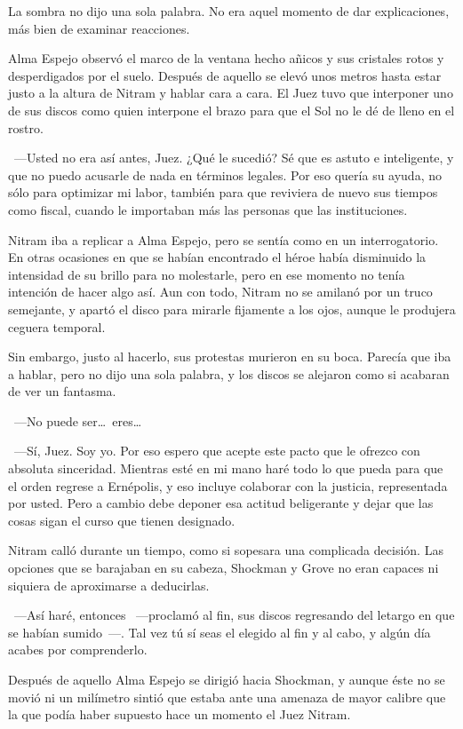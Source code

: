 La sombra no dijo una sola palabra. No era aquel momento de dar explicaciones, más bien de examinar reacciones.

Alma Espejo observó el marco de la ventana hecho añicos y sus cristales rotos y desperdigados por el suelo. Después de aquello se elevó unos metros hasta estar justo a la altura de Nitram y hablar cara a cara. El Juez tuvo que interponer uno de sus discos como quien interpone el brazo para que el Sol no le dé de lleno en el rostro.

~---Usted no era así antes, Juez. ¿Qué le sucedió? Sé que es astuto e inteligente, y que no puedo acusarle de nada en términos legales. Por eso quería su ayuda, no sólo para optimizar mi labor, también para que reviviera de nuevo sus tiempos como fiscal, cuando le importaban más las personas que las instituciones.

Nitram iba a replicar a Alma Espejo, pero se sentía como en un interrogatorio. En otras ocasiones en que se habían encontrado el héroe había disminuido la intensidad de su brillo para no molestarle, pero en ese momento no tenía intención de hacer algo así. Aun con todo, Nitram no se amilanó por un truco semejante, y apartó el disco para mirarle fijamente a los ojos, aunque le produjera ceguera temporal.

Sin embargo, justo al hacerlo, sus protestas murieron en su boca. Parecía que iba a hablar, pero no dijo una sola palabra, y los discos se alejaron como si acabaran de ver un fantasma.

~---No puede ser\dots\ eres\dots

~---Sí, Juez. Soy yo. Por eso espero que acepte este pacto que le ofrezco con absoluta sinceridad. Mientras esté en mi mano haré todo lo que pueda para que el orden regrese a Ernépolis, y eso incluye colaborar con la justicia, representada por usted. Pero a cambio debe deponer esa actitud beligerante y dejar que las cosas sigan el curso que tienen designado.

Nitram calló durante un tiempo, como si sopesara una complicada decisión. Las opciones que se barajaban en su cabeza, Shockman y Grove no eran capaces ni siquiera de aproximarse a deducirlas.

~---Así haré, entonces ~---proclamó al fin, sus discos regresando del letargo en que se habían sumido~---. Tal vez tú sí seas el elegido al fin y al cabo, y algún día acabes por comprenderlo.

Después de aquello Alma Espejo se dirigió hacia Shockman, y aunque éste no se movió ni un milímetro sintió que estaba ante una amenaza de mayor calibre que la que podía haber supuesto hace un momento el Juez Nitram.

